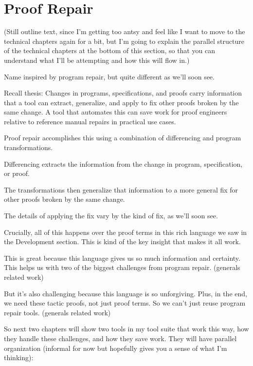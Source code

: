 \section{Proof Repair}
\label{sec:mot-rep}

(Still outline text, since I'm getting too antsy and feel like I want to move to the technical chapters again for a bit, but I'm going to explain the parallel structure of the technical
chapters at the bottom of this section, so that you can understand what I'll be attempting and how this will flow in.)

Name inspired by program repair, but quite different as we'll soon see.

Recall thesis: Changes in programs, specifications, and proofs carry information that a tool can extract, generalize, and apply to fix other proofs broken by the same change. A tool that automates this can save work for proof engineers relative to reference manual repairs in practical use cases.

Proof repair accomplishes this using a combination of differencing and program transformations.

Differencing extracts the information from the change in program, specification, or proof.

The transformations then generalize that information to a more general fix for other proofs broken by the same change.

The details of applying the fix vary by the kind of fix, as we'll soon see.

Crucially, all of this happens over the proof terms in this rich language we saw in the Development section. This is kind of the key insight that makes it all work.

This is great because this language gives us so much information and certainty. This helps us with two of the biggest challenges from program repair. (generals related work)

But it's also challenging because this language is so unforgiving. Plus, in the end, we need these tactic proofs, not just proof terms. So we can't just reuse program repair tools. (generals related work)

So next two chapters will show two tools in my tool suite that work this way, how they handle these challenges, and how they save work.
They will have parallel organization (informal for now but hopefully gives you a sense of what I'm thinking):

